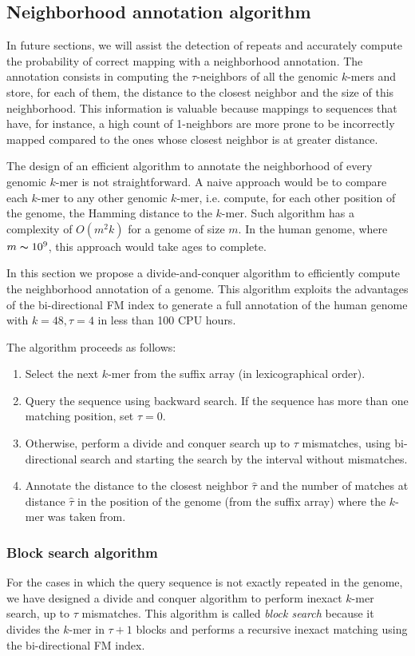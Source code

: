 \subsection{Neighborhood annotation algorithm}
\label{chap2:sec:annotation_alg}
In future sections, we will assist the detection of repeats and
accurately compute the probability of correct mapping with a
neighborhood annotation. The annotation consists in computing the
$\tau$-neighbors of all the genomic $k$-mers and store, for each of
them, the distance to the closest neighbor and the size of this
neighborhood. This information is valuable because mappings to
sequences that have, for instance, a high count of 1-neighbors are
more prone to be incorrectly mapped compared to the ones whose closest
neighbor is at greater distance.

The design of an efficient algorithm to annotate the neighborhood of
every genomic $k$-mer is not straightforward. A naive approach would
be to compare each $k$-mer to any other genomic $k$-mer, i.e. compute,
for each other position of the genome, the Hamming distance to the
$k$-mer. Such algorithm has a complexity of $O(m^2k)$ for a genome of
size $m$. In the human genome, where $m \thicksim 10^9$, this
approach would take ages to complete. 

In this section we propose a divide-and-conquer algorithm to efficiently
compute the neighborhood annotation of a genome. This algorithm
exploits the advantages of the bi-directional FM index to generate a
full annotation of the human genome with $k=48, \tau=4$ in less than
100 CPU hours.

The algorithm proceeds as follows:
\begin{enumerate}
\item Select the next $k$-mer from the suffix array (in
  lexicographical order).
\item Query the sequence using backward search. If the sequence has
  more than one matching position, set $\tau=0$.
\item Otherwise, perform a divide and conquer search up to $\tau$
  mismatches, using bi-directional search and starting the search by
  the interval without mismatches.
\item Annotate the distance to the closest neighbor $\hat{\tau}$ and
  the number of matches at distance $\hat{\tau}$ in the position of
  the genome (from the suffix array) where the $k$-mer was taken from.
\end{enumerate}

\subsubsection{Block search algorithm}
For the cases in which the query sequence is not exactly repeated in
the genome, we have designed a divide and conquer algorithm to perform
inexact $k$-mer search, up to $\tau$ mismatches. This algorithm is
called {\em block search} because it divides the $k$-mer in $\tau+1$
blocks and performs a recursive inexact matching using the
bi-directional FM index.

